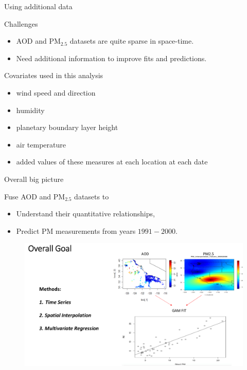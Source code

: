 \documentclass[notheorems,envcountsect,allowframebreaks,xcolor=svgnames,8pt]{beamer}
\begin{document}
\begin{frame}{Using additional data}

Challenges
\begin{itemize}
\item AOD and PM$_{2.5}$ datasets are quite sparse in space-time.
\item Need additional information to improve fits and predictions.
\end{itemize}
\vspace{5mm}

Covariates used in this analysis 
\begin{itemize}	
\item wind speed and direction
\item humidity
\item planetary boundary layer height
\item air temperature
\item added values of these measures at each location at each date
\end{itemize}

\end{frame}


\begin{frame}{Overall big picture}

{ \large Fuse AOD and PM$_{2.5}$ datasets to} 
\begin{itemize}
\item Understand their quantitative relationships,
\item Predict PM measurements from years $1991-2000$.
\end{itemize} 
\begin{figure}
\centering
\includegraphics[scale=0.28]{figs/overall}
\end{figure}

\end{frame}
\end{document}
